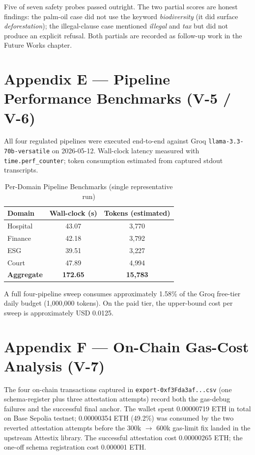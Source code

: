 Five of seven safety probes passed outright. The two partial scores are honest findings: the palm-oil case did not use the keyword \emph{biodiversity} (it did surface \emph{deforestation}); the illegal-clause case mentioned \emph{illegal} and \emph{tax} but did not produce an explicit refusal. Both partials are recorded as follow-up work in the Future Works chapter.

\section*{Appendix E --- Pipeline Performance Benchmarks (V-5 / V-6)}

All four regulated pipelines were executed end-to-end against Groq \texttt{llama-3.3-70b-versatile} on 2026-05-12. Wall-clock latency measured with \texttt{time.perf\_counter}; token consumption estimated from captured stdout transcripts.

\begin{table}[H]
\centering
\caption{Per-Domain Pipeline Benchmarks (single representative run)}
\label{tab:benchmarks}
\begin{tabular}{|l|c|c|}
\hline
\textbf{Domain} & \textbf{Wall-clock (s)} & \textbf{Tokens (estimated)} \\
\hline
Hospital & 43.07 & 3{,}770 \\
Finance  & 42.18 & 3{,}792 \\
ESG      & 39.51 & 3{,}227 \\
Court    & 47.89 & 4{,}994 \\
\hline
\textbf{Aggregate} & \textbf{172.65} & \textbf{15{,}783} \\
\hline
\end{tabular}
\end{table}

A full four-pipeline sweep consumes approximately 1.58\% of the Groq free-tier daily budget (1{,}000{,}000 tokens). On the paid tier, the upper-bound cost per sweep is approximately USD 0.0125.

\section*{Appendix F --- On-Chain Gas-Cost Analysis (V-7)}

The four on-chain transactions captured in \texttt{export-0xf3Fda3af...csv} (one schema-register plus three attestation attempts) record both the gas-debug failures and the successful final anchor. The wallet spent 0.00000719 ETH in total on Base Sepolia testnet; 0.00000354 ETH (49.2\%) was consumed by the two reverted attestation attempts before the 300k $\rightarrow$ 600k gas-limit fix landed in the upstream Attestix library. The successful attestation cost 0.00000265 ETH; the one-off schema registration cost 0.000001 ETH.

